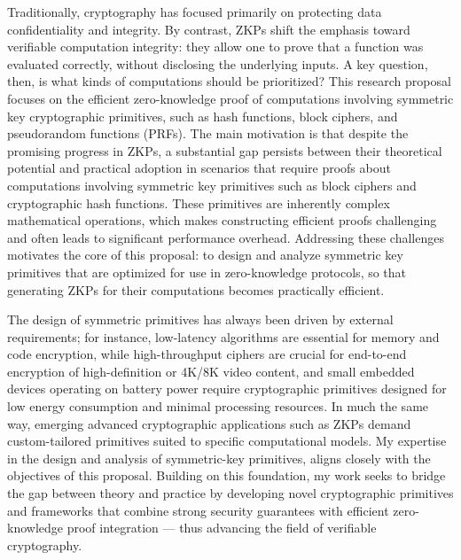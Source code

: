 Traditionally, cryptography has focused primarily on protecting data confidentiality and integrity.
By contrast, ZKPs shift the emphasis toward verifiable computation integrity: they allow one to prove that a function was evaluated correctly, without disclosing the underlying inputs.
A key question, then, is what kinds of computations should be prioritized?
This research proposal focuses on the efficient zero-knowledge proof of computations involving symmetric key cryptographic primitives, such as hash functions, block ciphers, and pseudorandom functions (PRFs).
The main motivation is that despite the promising progress in ZKPs, a substantial gap persists between their theoretical potential and practical adoption in scenarios that require proofs about computations involving symmetric key primitives such as block ciphers and cryptographic hash functions.
These primitives are inherently complex mathematical operations, which makes constructing efficient proofs challenging and often leads to significant performance overhead.
Addressing these challenges motivates the core of this proposal: to design and analyze symmetric key primitives that are optimized for use in zero-knowledge protocols, so that generating ZKPs for their computations becomes practically efficient.

The design of symmetric primitives has always been driven by external requirements; for instance, low-latency algorithms are essential for memory and code encryption, while high-throughput ciphers are crucial for end-to-end encryption of high-definition or 4K/8K video content, and small embedded devices operating on battery power require cryptographic primitives designed for low energy consumption and minimal processing resources.
In much the same way, emerging advanced cryptographic applications such as ZKPs demand custom-tailored primitives suited to specific computational models.
My expertise in the design and analysis of symmetric-key primitives, aligns closely with the objectives of this proposal.
Building on this foundation, my work seeks to bridge the gap between theory and practice by developing novel cryptographic primitives and frameworks that combine strong security guarantees with efficient zero-knowledge proof integration --- thus advancing the field of verifiable cryptography.
